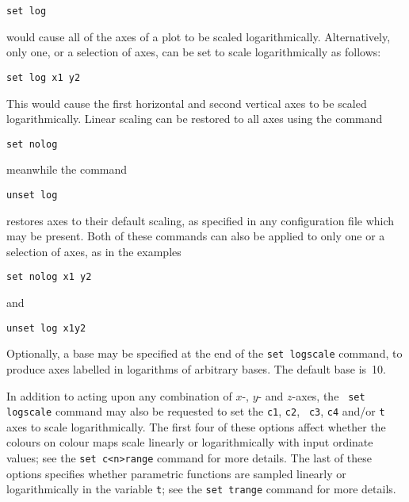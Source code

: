 \begin{verbatim}
set log
\end{verbatim}

\noindent would cause all of the axes of a plot to be scaled logarithmically.
Alternatively, only one, or a selection of axes, can be set to scale
logarithmically as follows:

\begin{verbatim}
set log x1 y2
\end{verbatim}

\noindent This would cause the first horizontal and second vertical axes to be
scaled logarithmically.  Linear scaling can be restored to all axes using the
command

\begin{verbatim}
set nolog
\end{verbatim}

\noindent meanwhile the command

\begin{verbatim}
unset log
\end{verbatim}

\noindent restores axes to their default scaling, as specified in any
configuration file which may be present. Both of these commands can also be
applied to only one or a selection of axes, as in the examples

\begin{verbatim}
set nolog x1 y2
\end{verbatim}

\noindent and

\begin{verbatim}
unset log x1y2
\end{verbatim}

Optionally, a base may be specified at the end of the {\tt set logscale}
command, to produce axes labelled in logarithms of arbitrary bases.  The
default base is~10.

In addition to acting upon any combination of $x$-, $y$- and $z$-axes, the {\tt
set logscale} command may also be requested to set the {\tt c1}, {\tt c2}, {\tt
c3}, {\tt c4} and/or {\tt t} axes to scale logarithmically. The first four
of these options affect whether the colours on colour maps scale linearly or
logarithmically with input ordinate values; see the {\tt set c<n>range} command
for more details. The last of these options specifies whether parametric
functions are sampled linearly or logarithmically in the variable {\tt t}; see
the {\tt set trange} command for more details.


